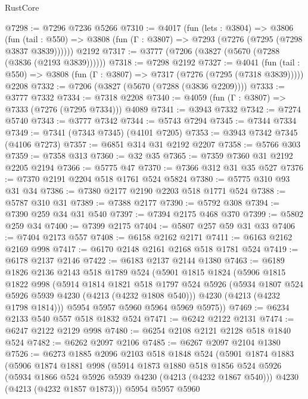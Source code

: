 \begin{lexlean}{RustCore}
\begin{coremodule}
@7298 := @7296 @7236 @5266
@7310 := @4017
    (fun (lets : @3804) =>
    @3806
      (fun (tail : @550) => @3808 (fun (Γ : @3807) => @7293 (@7276 (@7295 (@7298 @3837 @3839))))))
    @2192
@7317 := @3777 (@7206 (@3827 (@5670 (@7288 (@3836 (@2193 @3839))))))
@7318 := @7298 @2192
@7327 := @4041
    (fun (tail : @550) => @3808 (fun (Γ : @3807) => @7317 (@7276 (@7295 (@7318 @3839)))))
    @2208
@7332 := @7206 (@3827 (@5670 (@7288 (@3836 @2209))))
@7333 := @3777 @7332
@7334 := @7318 @2208
@7340 := @4059 (fun (Γ : @3807) => @7333 (@7276 (@7295 @7334))) @4089
@7341 := @3943 @7332
@7342 := @7274 @5740
@7343 := @3777 @7342
@7344 := @5743 @7294
@7345 := @7344 @7334
@7349 := @7341 (@7343 @7345) (@4101 @7205)
@7353 := @3943 @7342 @7345 (@4106 @7273)
@7357 := @6851 @314 @31 @2192 @2207
@7358 := @5766 @303
@7359 := @7358 @313
@7360 := @32 @35
@7365 := @7359 @7360 @31 @2192 @2205 @2194
@7366 := @5775 @47
@7370 := @7366 @312 @31 @35 @527
@7376 := @7370 @2191 @2204 @518 @1761 @524 @5824
@7380 := @5775 @310 @93 @31 @34
@7386 := @7380 @2177 @2190 @2203 @518 @1771 @524
@7388 := @5787 @310 @31
@7389 := @7388 @2177
@7390 := @5792 @308
@7394 := @7390 @259 @34 @31 @540
@7397 := @7394 @2175 @468 @370
@7399 := @5802 @259 @34
@7400 := @7399 @2175
@7404 := @5807 @257 @59 @31 @33
@7406 := @7404 @2173 @557
@7408 := @6158 @2162 @2171
@7411 := @6163 @2162 @2169 @998
@7417 := @6170 @2148 @2161 @2168 @518 @1781 @524
@7419 := @6178 @2137 @2146
@7422 := @6183 @2137 @2144 @1380
@7463 := @6189
    @1826
    @2136
    @2143
    @518
    @1789
    @524
    (@5901
      @1815
      @1824
      (@5906
        @1815
        @1822
        @998
        (@5914
          @1814
          @1821
          @518
          @1797
          @524
          @5926
          (@5934 @1807 @524 @5926 @5939 @4230 (@4213 (@4232 @1808 @540)))
          @4230
          (@4213 (@4232 @1798 @1814)))
        @5954
        @5957
        @5960
        @5964
        @5969
        @5975))
@7469 := @6234 @2133 @540 @557 @518 @1832 @524
@7471 := @6242 @2122 @2131
@7474 := @6247 @2122 @2129 @998
@7480 := @6254 @2108 @2121 @2128 @518 @1840 @524
@7482 := @6262 @2097 @2106
@7485 := @6267 @2097 @2104 @1380
@7526 := @6273
    @1885
    @2096
    @2103
    @518
    @1848
    @524
    (@5901
      @1874
      @1883
      (@5906
        @1874
        @1881
        @998
        (@5914
          @1873
          @1880
          @518
          @1856
          @524
          @5926
          (@5934 @1866 @524 @5926 @5939 @4230 (@4213 (@4232 @1867 @540)))
          @4230
          (@4213 (@4232 @1857 @1873)))
        @5954
        @5957
        @5960

\end{coremodule}
\end{lexlean}
